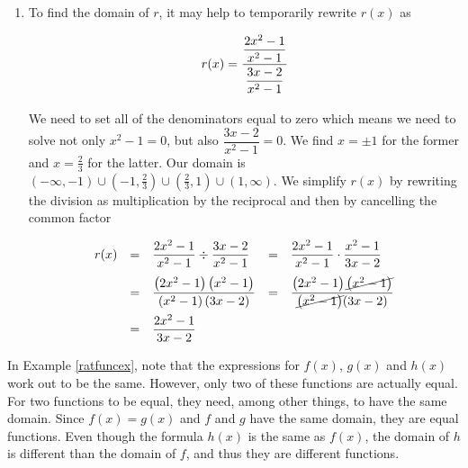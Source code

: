 {\begin{enumerate}
\[ \begin{array}{rclcl}

h(x) & = & \dfrac{2x^2-1}{x^2-1} - \dfrac{3x-2}{x^2-1} & = & \dfrac{\left(2x^2-1\right) - \left(3x-2\right)}{x^2-1} \\ [.15in]
     & = & \dfrac{2x^2-1 - 3x+2}{x^2-1} & = &  \dfrac{2x^2 - 3x+1}{x^2-1} \\ [.15in]
     & = & \dfrac{(2x-1)(x-1)}{(x+1)(x-1)} & = & \dfrac{(2x-1)\cancel{(x-1)}}{(x+1)\cancel{(x-1)}} \\ [.15in]
     & = & \dfrac{2x-1}{x+1} & & 
\end{array} \]

\item  To find the domain of $r$, it may help to temporarily rewrite $r(x)$ as

\[ r(x) = \dfrac{\dfrac{2x^2-1}{x^2-1} }{\dfrac{3x-2}{x^2-1}\vphantom{\left(\dfrac{X}{X}\right)}}\]

We need to set all of the denominators equal to zero which means we need to solve not only  $x^2-1= 0$, but also $\dfrac{3x-2}{x^2-1}=0$.  We find $x = \pm 1$ for the former and $x= \frac{2}{3}$ for the latter.  Our domain is $(-\infty, -1) \cup \left(-1,\frac{2}{3}\right) \cup \left(\frac{2}{3},1\right) \cup (1, \infty)$.  We simplify $r(x)$ by rewriting the division as multiplication by the reciprocal and then by cancelling the common factor

\[ \begin{array}{rclcl}

r(x) & = & \dfrac{2x^2-1}{x^2-1} \div \dfrac{3x-2}{x^2-1} & = & \dfrac{2x^2-1}{x^2-1} \cdot \dfrac{x^2-1}{3x-2}\\[.15in]
 & = & \dfrac{\left(2x^2-1\right)\left(x^2-1\right)}{\left(x^2-1\right)(3x-2)} & = & \dfrac{\left(2x^2-1\right)\cancel{\left(x^2-1\right)}}{\cancel{\left(x^2-1\right)}(3x-2)}\\[.15in]
  & = & \dfrac{2x^2-1}{3x-2}   & &
\end{array}\]

\end{enumerate}
}

\medskip




In Example \ref{ratfuncex}, note that the expressions for $f(x)$, $g(x)$ and $h(x)$ work out to be the same.  However, only two of these functions are actually equal.  For two functions to be equal, they need, among other things, to have the same domain.  Since $f(x) = g(x)$ and $f$ and $g$ have the same domain, they are equal functions.  Even though the formula $h(x)$ is the same as $f(x)$, the domain of $h$ is different than the domain of $f$, and thus they are different functions.  

